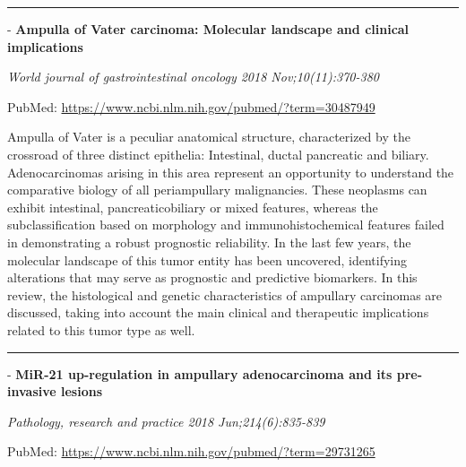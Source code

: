 \documentclass[]{article}
\begin{document}
{}

{}

\begin{center}\rule{0.5\linewidth}{\linethickness}\end{center}

 - \textbf{Ampulla of Vater carcinoma: Molecular landscape and clinical
implications}

\emph{World journal of gastrointestinal oncology 2018
Nov;10(11):370-380}

PubMed: \url{https://www.ncbi.nlm.nih.gov/pubmed/?term=30487949}

Ampulla of Vater is a peculiar anatomical structure, characterized by
the crossroad of three distinct epithelia: Intestinal, ductal pancreatic
and biliary. Adenocarcinomas arising in this area represent an
opportunity to understand the comparative biology of all periampullary
malignancies. These neoplasms can exhibit intestinal, pancreaticobiliary
or mixed features, whereas the subclassification based on morphology and
immunohistochemical features failed in demonstrating a robust prognostic
reliability. In the last few years, the molecular landscape of this
tumor entity has been uncovered, identifying alterations that may serve
as prognostic and predictive biomarkers. In this review, the
histological and genetic characteristics of ampullary carcinomas are
discussed, taking into account the main clinical and therapeutic
implications related to this tumor type as well.

{}

{}

\begin{center}\rule{0.5\linewidth}{\linethickness}\end{center}

 - \textbf{MiR-21 up-regulation in ampullary adenocarcinoma and its
pre-invasive lesions}

\emph{Pathology, research and practice 2018 Jun;214(6):835-839}

PubMed: \url{https://www.ncbi.nlm.nih.gov/pubmed/?term=29731265}
\end{document}
